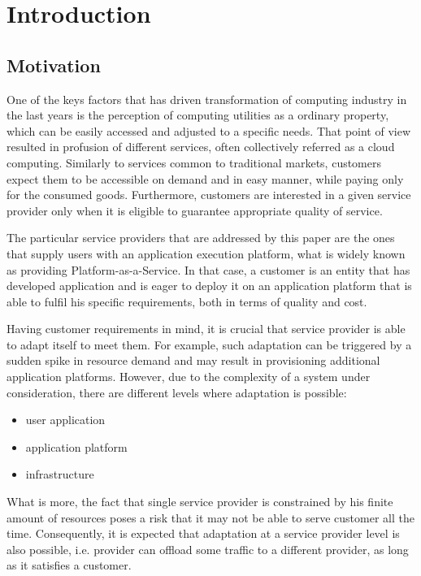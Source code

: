 \chapter{Introduction}

\section{Motivation}
One of the keys factors that has driven transformation of computing industry in the last years is the perception of computing utilities as a ordinary property, which can be easily accessed and adjusted to a specific needs. That point of view resulted in profusion of different services, often collectively referred as a cloud computing. Similarly to services common to traditional markets, customers expect them to be accessible on demand and in easy manner, while paying only for the consumed goods. Furthermore, customers are interested in a given service provider only when it is eligible to guarantee appropriate quality of service.

The particular service providers that are addressed by this paper are the ones that supply users with an application execution platform, what is widely known as providing Platform-as-a-Service. In that case, a customer is an entity that has developed application and is eager to deploy it on an application platform that is able to fulfil his specific requirements, both in terms of quality and cost.

Having customer requirements in mind, it is crucial that service provider is able to adapt itself to meet them. For example, such adaptation can be triggered by a sudden spike in resource demand and may result in provisioning additional application platforms. However, due to the complexity of a system under consideration, there are different levels where adaptation is possible:
\begin{itemize}
	\item user application
	\item application platform
	\item infrastructure
\end{itemize} 
What is more, the fact that single service provider is constrained by his finite amount of resources poses a risk that it may not be able to serve customer all the time. Consequently, it is expected that adaptation at a service provider level is also possible, i.e. provider can offload some traffic to a different provider, as long as it satisfies a customer.

